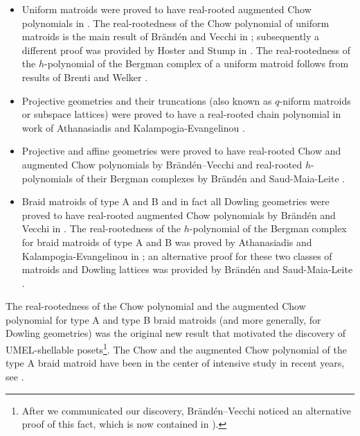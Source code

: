 \documentclass[11pt,a4paper]{amsart}
\theoremstyle{results}
\theoremstyle{definitions}
\begin{document}
\begin{itemize}
[leftmargin=18pt,itemsep=-1pt]
    \item Uniform matroids were proved to have real-rooted augmented Chow polynomials in \cite[Theorem~1.10]{ferroni-matherne-stevens-vecchi}. The real-rootedness of the Chow polynomial of uniform matroids is the main result of Br\"and\'en and Vecchi in \cite{branden-vecchi1}; subsequently a different proof was provided by Hoster and Stump in \cite{hoster-stump}. The real-rootedness of the $h$-polynomial of the Bergman complex of a uniform matroid follows from results of Brenti and Welker \cite{brenti-welker}.
    \item Projective geometries and their truncations (also known as $q$-niform matroids \cite{proudfoot-qniform} or subspace lattices) were proved to have a real-rooted chain polynomial in work of Athanasiadis and Kalampogia-Evangelinou \cite[Proposition~3.1]{athanasiadis-kalampogia}. 
    \item Projective and affine geometries were proved to have real-rooted Chow and augmented Chow polynomials by Br\"and\'en--Vecchi \cite[Section~6]{branden-vecchi2} and real-rooted $h$-polynomials of their Bergman complexes by Br\"and\'en and Saud-Maia-Leite \cite[Theorem~3.7]{branden-saud1}.
    \item Braid matroids of type A and B and in fact all Dowling geometries were proved to have real-rooted augmented Chow polynomials by Br\"and\'en and Vecchi in \cite{branden-vecchi2}. The real-rootedness of the $h$-polynomial of the Bergman complex for braid matroids of type A and B was proved by Athanasiadis and Kalampogia-Evangelinou in \cite[Section~3]{athanasiadis-kalampogia}; an alternative proof for these two classes of matroids and Dowling lattices was provided by Br\"and\'en and Saud-Maia-Leite \cite[Theorem~4.1]{branden-saud1}. 
\end{itemize}

The real-rootedness of the Chow polynomial and the augmented Chow polynomial for type A and type B braid matroids (and more generally, for Dowling geometries) was the original new result that motivated the discovery of UMEL-shellable posets\footnote{After we communicated our discovery, Br\"and\'en--Vecchi noticed an alternative proof of this fact, which is now contained in \cite[Section~6]{branden-vecchi2}).}. The Chow and the augmented Chow polynomial of the type A braid matroid have been in the center of intensive study in recent years, see \cite{gaiffi-serventi,ferroni-matherne-stevens-vecchi,ferroni-matherne-vecchi,liao,stump,eur-ferroni-matherne-pagaria-vecchi,kannan-kuhne}.
\end{document}
